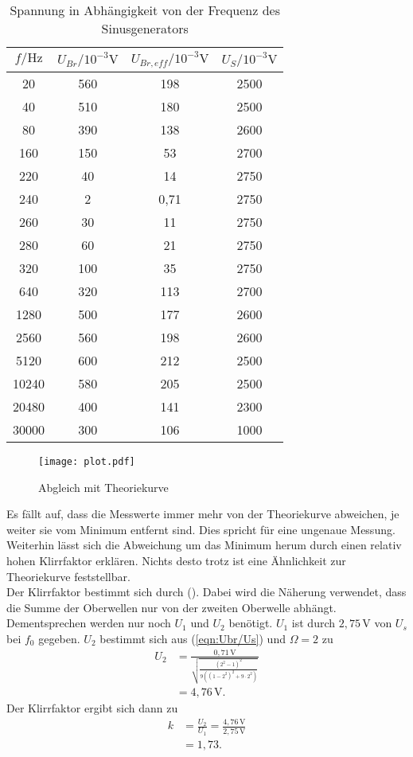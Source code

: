 \begin{table}
  \centering
  \caption{Spannung in Abhängigkeit von der Frequenz des Sinusgenerators}
  \label{tab:Wien-Robinson}
  \begin{tabular}{c c c c}
    \toprule
    $f/\unit{\hertz}$ & $ U_{Br}/10^{-3}\unit{\volt}$ & $U_{Br,eff}/10^{-3}\unit{\volt}$ & $U_{S}/10^{-3}\unit{\volt}$ \\
    \midrule
       20 & 560 & 198   & 2500 \\
       40 & 510 & 180   & 2500 \\
       80 & 390 & 138   & 2600 \\
      160 & 150 &  53   & 2700 \\
      220 &  40 &  14   & 2750 \\
      240 &   2 &  0,71 & 2750 \\
      260 &  30 &  11   & 2750 \\
      280 &  60 &  21   & 2750 \\
      320 & 100 &  35   & 2750 \\
      640 & 320 & 113   & 2700 \\
     1280 & 500 & 177   & 2600 \\
     2560 & 560 & 198   & 2600 \\
     5120 & 600 & 212   & 2500 \\
    10240 & 580 & 205   & 2500 \\
    20480 & 400 & 141   & 2300 \\
    30000 & 300 & 106   & 1000 \\
    \bottomrule
  \end{tabular}
\end{table}

\begin{figure}
  \centering
  \texttt{[image: plot.pdf]}
  \caption{Abgleich mit Theoriekurve}
  \label{fig:plot}
\end{figure}
Es fällt auf, dass die Messwerte immer mehr von der Theoriekurve abweichen, je weiter sie vom Minimum entfernt sind. Dies spricht für eine ungenaue Messung.
Weiterhin lässt sich die Abweichung um das Minimum herum durch einen relativ hohen Klirrfaktor erklären. Nichts desto trotz ist eine Ähnlichkeit zur Theoriekurve
feststellbar.
\\
Der Klirrfaktor bestimmt sich durch (). Dabei wird die Näherung verwendet, dass die Summe der Oberwellen nur von der zweiten Oberwelle abhängt. Dementsprechen werden
nur noch $U_1$ und $U_2$ benötigt. $U_1$ ist durch $2,75\,\unit{\volt}$ von $U_s$ bei $f_0$ gegeben. $U_2$ bestimmt sich aus (\ref{eqn:Ubr/Us}) und $\Omega = 2$ zu
\begin{align*}
  U_2 &= \frac{0,71\,\unit{\volt}}{\sqrt{\frac{(2^2 -1)^2}{9((1-2^2)^2 +9\cdot2^2)}}}\\
 &= 4,76\,\unit{\volt}.
\end{align*}
Der Klirrfaktor ergibt sich dann zu
\begin{align*}
  k &= \frac{U_2}{U_1} = \frac{4,76\,\unit{\volt}}{2,75\,\unit{\volt}} \\
  &= 1,73.
\end{align*}